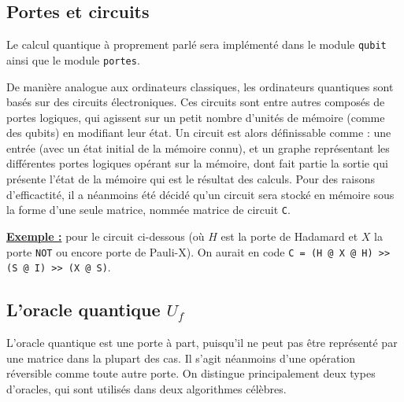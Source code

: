 \documentclass[french]{article}
\newcommand{\p}{\texttt} %
\newcommand{\exemple}{\textbf{\underline{Exemple :} }}
\begin{document}
\subsection{Portes et circuits}

Le calcul quantique à proprement parlé sera implémenté dans le module \p{qubit} ainsi que le module \p{portes}.

De manière analogue aux ordinateurs classiques, les ordinateurs quantiques sont basés sur des circuits électroniques. Ces circuits sont entre autres composés de portes logiques, qui agissent sur un petit nombre d'unités de mémoire (comme des qubits) en modifiant leur état. Un circuit est alors définissable comme : une entrée (avec un état initial de la mémoire connu), et un graphe représentant les différentes portes logiques opérant sur la mémoire, dont fait partie la sortie qui présente l'état de la mémoire qui est le résultat des calculs. Pour des raisons d'efficactité, il a néanmoins été décidé qu'un circuit sera stocké en mémoire sous la forme d'une seule matrice, nommée matrice de circuit \p{C}. \newline

\noindent \exemple pour le circuit ci-dessous (où $H$ est la porte de Hadamard et $X$ la porte \p{NOT} ou encore porte de Pauli-X). On aurait en code \texttt{C = (H @  X @ H) >> (S @ I) >> (X @ S)}.



\subsection{L'oracle quantique $U_f$}


L'oracle quantique est une porte à part, puisqu'il ne peut pas être représenté par une matrice dans la plupart des cas. Il s'agit néanmoins d'une opération réversible comme toute autre porte. On distingue principalement deux types d'oracles, qui sont utilisés dans deux algorithmes célèbres.
\end{document}
